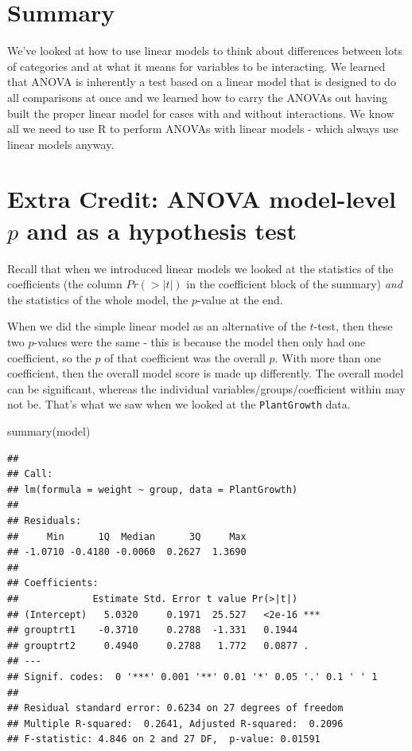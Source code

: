 \documentclass[
]{book}
\newenvironment{Shaded}{\begin{snugshade}}{\end{snugshade}}
\newcommand{\FunctionTok}[1]{\textcolor[rgb]{0.00,0.00,0.00}{#1}}
\newcommand{\NormalTok}[1]{#1}
\begin{document}
\hypertarget{summary}{%
\section{Summary}\label{summary}}

We've looked at how to use linear models to think about differences between lots of categories and at what it means for variables to be interacting. We learned that ANOVA is inherently a test based on a linear model that is designed to do all comparisons at once and we learned how to carry the ANOVAs out having built the proper linear model for cases with and without interactions. We know all we need to use R to perform ANOVAs with linear models - which always use linear models anyway.

\hypertarget{extra-credit-anova-model-level-p-and-as-a-hypothesis-test}{%
\section{\texorpdfstring{Extra Credit: ANOVA model-level \(p\) and as a hypothesis test}{Extra Credit: ANOVA model-level p and as a hypothesis test}}\label{extra-credit-anova-model-level-p-and-as-a-hypothesis-test}}

Recall that when we introduced linear models we looked at the statistics of the coefficients (the column \(Pr(>|t|)\) in the coefficient block of the summary) \emph{and} the statistics of the whole model, the \(p\)-value at the end.

When we did the simple linear model as an alternative of the \(t\)-test, then these two \(p\)-values were the same - this is because the model then only had one coefficient, so the \(p\) of that coefficient was the overall \(p\). With more than one coefficient, then the overall model score is made up differently. The overall model can be significant, whereas the individual variables/groups/coefficient within may not be. That's what we saw when we looked at the \texttt{PlantGrowth} data.

\begin{Shaded}
\begin{Highlighting}[]
\FunctionTok{summary}\NormalTok{(model)}
\end{Highlighting}
\end{Shaded}

\begin{verbatim}
## 
## Call:
## lm(formula = weight ~ group, data = PlantGrowth)
## 
## Residuals:
##     Min      1Q  Median      3Q     Max 
## -1.0710 -0.4180 -0.0060  0.2627  1.3690 
## 
## Coefficients:
##             Estimate Std. Error t value Pr(>|t|)    
## (Intercept)   5.0320     0.1971  25.527   <2e-16 ***
## grouptrt1    -0.3710     0.2788  -1.331   0.1944    
## grouptrt2     0.4940     0.2788   1.772   0.0877 .  
## ---
## Signif. codes:  0 '***' 0.001 '**' 0.01 '*' 0.05 '.' 0.1 ' ' 1
## 
## Residual standard error: 0.6234 on 27 degrees of freedom
## Multiple R-squared:  0.2641,	Adjusted R-squared:  0.2096 
## F-statistic: 4.846 on 2 and 27 DF,  p-value: 0.01591
\end{verbatim}
\end{document}
